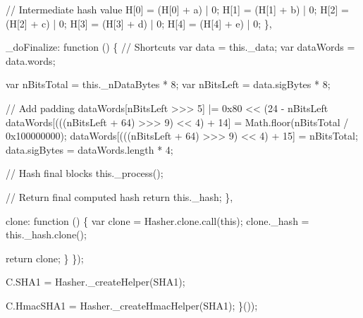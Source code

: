\begin{DoxyCodeInclude}
            \textcolor{comment}{// Intermediate hash value}
            H[0] = (H[0] + a) | 0;
            H[1] = (H[1] + b) | 0;
            H[2] = (H[2] + c) | 0;
            H[3] = (H[3] + d) | 0;
            H[4] = (H[4] + e) | 0;
        \},

        \_doFinalize: \textcolor{keyword}{function} () \{
            \textcolor{comment}{// Shortcuts}
            var data = this.\_data;
            var dataWords = data.words;

            var nBitsTotal = this.\_nDataBytes * 8;
            var nBitsLeft = data.sigBytes * 8;

            \textcolor{comment}{// Add padding}
            dataWords[nBitsLeft >>> 5] |= 0x80 << (24 - nBitsLeft %
            dataWords[(((nBitsLeft + 64) >>> 9) << 4) + 14] = Math.floor(nBitsTotal / 0x100000000);
            dataWords[(((nBitsLeft + 64) >>> 9) << 4) + 15] = nBitsTotal;
            data.sigBytes = dataWords.length * 4;

            \textcolor{comment}{// Hash final blocks}
            this.\_process();

            \textcolor{comment}{// Return final computed hash}
            \textcolor{keywordflow}{return} this.\_hash;
        \},

        clone: \textcolor{keyword}{function} () \{
            var clone = Hasher.clone.call(\textcolor{keyword}{this});
            clone.\_hash = this.\_hash.clone();

            \textcolor{keywordflow}{return} clone;
        \}
    \});

    C.SHA1 = Hasher.\_createHelper(SHA1);

    C.HmacSHA1 = Hasher.\_createHmacHelper(SHA1);
\}());
\end{DoxyCodeInclude}
 